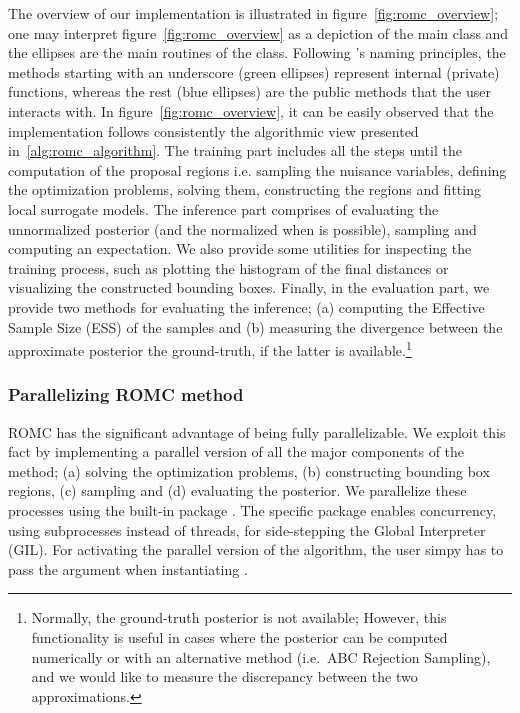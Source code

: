 

The overview of our implementation is illustrated in
figure~\ref{fig:romc_overview}; one may interpret
figure~\ref{fig:romc_overview} as a depiction of the main class and
the ellipses are the main routines of the class. Following
's naming principles, the methods starting with an
underscore (green ellipses) represent internal (private) functions,
whereas the rest (blue ellipses) are the public methods that the user
interacts with. In figure~\ref{fig:romc_overview}, it can be easily
observed that the implementation follows consistently the algorithmic
view presented in~\ref{alg:romc_algorithm}. The training part includes
all the steps until the computation of the proposal regions
i.e. sampling the nuisance variables, defining the optimization
problems, solving them, constructing the regions and fitting local
surrogate models. The inference part comprises of evaluating the
unnormalized posterior (and the normalized when is possible), sampling
and computing an expectation. We also provide some utilities for
inspecting the training process, such as plotting the histogram of the
final distances or visualizing the constructed bounding
boxes. Finally, in the evaluation part, we provide two methods for
evaluating the inference; (a) computing the Effective Sample Size
(ESS) of the samples and (b) measuring the divergence between the
approximate posterior the ground-truth, if the latter is
available.\footnote{Normally, the ground-truth posterior is not
  available; However, this functionality is useful in cases where the
  posterior can be computed numerically or with an alternative method
  (i.e.\ ABC Rejection Sampling), and we would like to measure the
  discrepancy between the two approximations.}

\subsubsection*{Parallelizing ROMC method}

ROMC has the significant advantage of being fully parallelizable. We
exploit this fact by implementing a parallel version of all the major
components of the method; (a) solving the optimization problems, (b)
constructing bounding box regions, (c) sampling and (d) evaluating the
posterior. We parallelize these processes using the built-in
 package . The specific package
enables concurrency, using subprocesses instead of threads, for
side-stepping the Global Interpreter (GIL). For activating the
parallel version of the algorithm, the user simpy has to pass the
argument  when instantiating .

